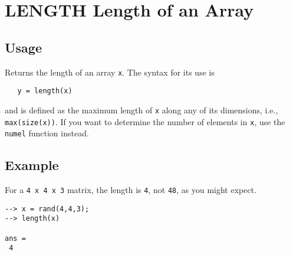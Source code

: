 \section{LENGTH Length of an Array}

\subsection{Usage}

Returns the length of an array \verb|x|.  The syntax for its use
is 
\begin{verbatim}
   y = length(x)
\end{verbatim}
and is defined as the maximum length of \verb|x| along any of its
dimensions, i.e., \verb|max(size(x))|.  If you want to determine the
number of elements in \verb|x|, use the \verb|numel| function instead.
\subsection{Example}

For a \verb|4 x 4 x 3| matrix, the length is \verb|4|, not \verb|48|, as you 
might expect.
\begin{verbatim}
--> x = rand(4,4,3);
--> length(x)

ans = 
 4 
\end{verbatim}
